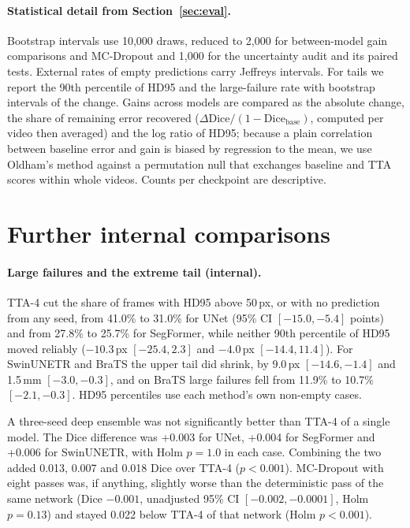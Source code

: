 \paragraph{Statistical detail from Section~\ref{sec:eval}.} Bootstrap intervals use 10{,}000 draws, reduced to 2{,}000 for between-model gain comparisons and MC-Dropout and 1{,}000 for the uncertainty audit and its paired tests. External rates of empty predictions carry Jeffreys intervals. For tails we report the 90th percentile of HD95 and the large-failure rate with bootstrap intervals of the change. Gains across models are compared as the absolute change, the share of remaining error recovered ($\Delta\mathrm{Dice}/(1-\mathrm{Dice}_{\text{base}})$, computed per video then averaged) and the log ratio of HD95; because a plain correlation between baseline error and gain is biased by regression to the mean, we use Oldham's method \cite{oldham1962} against a permutation null that exchanges baseline and TTA scores within whole videos. Counts per checkpoint are descriptive.

\section{Further internal comparisons}
\label{app:further}
\paragraph{Large failures and the extreme tail (internal).} TTA-4 cut the share of frames with HD95 above 50\,px, or with no prediction from any seed, from 41.0\% to 31.0\% for UNet (95\% CI $[-15.0, -5.4]$ points) and from 27.8\% to 25.7\% for SegFormer, while neither 90th percentile of HD95 moved reliably ($-10.3$\,px $[-25.4, 2.3]$ and $-4.0$\,px $[-14.4, 11.4]$). For SwinUNETR and BraTS the upper tail did shrink, by 9.0\,px $[-14.6, -1.4]$ and 1.5\,mm $[-3.0, -0.3]$, and on BraTS large failures fell from 11.9\% to 10.7\% $[-2.1, -0.3]$. HD95 percentiles use each method's own non-empty cases.

A three-seed deep ensemble was not significantly better than TTA-4 of a single model. The Dice difference was +0.003 for UNet, +0.004 for SegFormer and +0.006 for SwinUNETR, with Holm $p=1.0$ in each case. Combining the two added 0.013, 0.007 and 0.018 Dice over TTA-4 ($p<0.001$). MC-Dropout with eight passes was, if anything, slightly worse than the deterministic pass of the same network (Dice $-0.001$, unadjusted 95\% CI $[-0.002, -0.0001]$, Holm $p=0.13$) and stayed 0.022 below TTA-4 of that network (Holm $p<0.001$).

